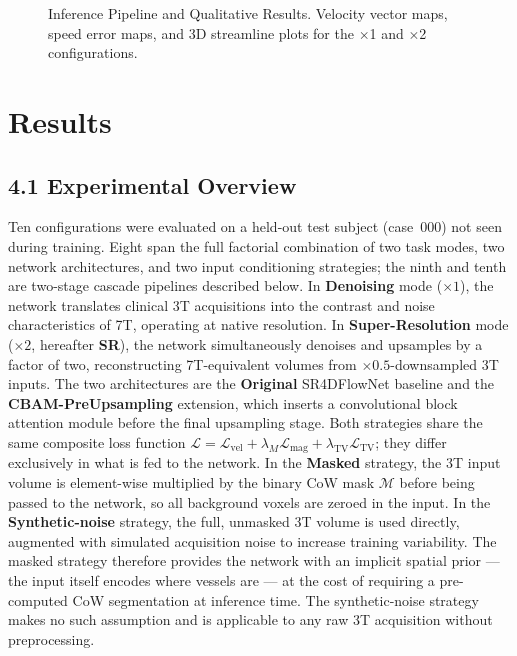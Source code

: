 \documentclass[11pt]{article}
\begin{document}
\begin{figure}[!htbp]
    \centering
    \caption{Inference Pipeline and Qualitative Results. Velocity vector maps, speed error maps, and 3D streamline plots for the $\times$1 and $\times$2 configurations.}
    \label{fig:inference}
\end{figure}

\section*{Results}

\subsection*{4.1 Experimental Overview}

Ten configurations were evaluated on a held-out test subject (case~000) not seen during
training.  Eight span the full factorial combination of two task modes, two network
architectures, and two input conditioning strategies; the ninth and tenth are two-stage cascade
pipelines described below.  In \textbf{Denoising} mode ($\times 1$),
the network translates clinical 3T acquisitions into the contrast and noise characteristics of
7T, operating at native resolution.  In \textbf{Super-Resolution} mode ($\times 2$, hereafter
\textbf{SR}), the network simultaneously denoises and upsamples by a factor of two, reconstructing
7T-equivalent volumes from $\times 0.5$-downsampled 3T inputs.  The two architectures are the
\textbf{Original} SR4DFlowNet baseline and the \textbf{CBAM-PreUpsampling} extension, which
inserts a convolutional block attention module before the final upsampling stage.  Both strategies share the same composite loss function
$\mathcal{L} = \mathcal{L}_\text{vel} + \lambda_M\mathcal{L}_\text{mag} +
\lambda_\text{TV}\mathcal{L}_\text{TV}$; they differ exclusively in what is fed to the network.
In the \textbf{Masked} strategy, the 3T input volume is element-wise multiplied by the binary
CoW mask $\mathcal{M}$ before being passed to the network, so all background voxels are zeroed
in the input.  In the \textbf{Synthetic-noise} strategy, the full, unmasked 3T volume is used
directly, augmented with simulated acquisition noise to increase training variability.  The
masked strategy therefore provides the network with an implicit spatial prior --- the input
itself encodes where vessels are --- at the cost of requiring a pre-computed CoW segmentation at
inference time.  The synthetic-noise strategy makes no such assumption and is applicable to any
raw 3T acquisition without preprocessing.
\end{document}
